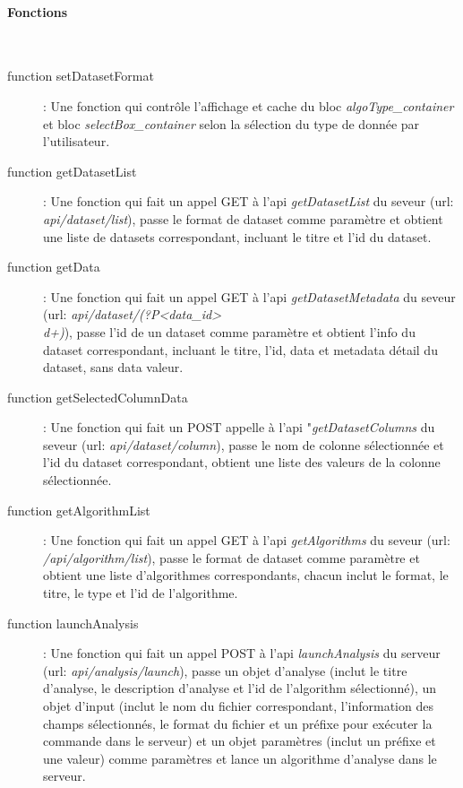 \documentclass[a4paper]{report}
\begin{document}
\paragraph{Fonctions}~\\
\begin{description}
	\item[function setDatasetFormat]: Une fonction qui contrôle l'affichage et cache du bloc \emph{algoType\_container} et bloc \emph{selectBox\_container} selon la sélection du type de donnée par l'utilisateur.
	
	\item[function getDatasetList]: Une fonction qui fait un appel GET à l'api \emph{getDatasetList} du seveur (url: \emph{api/dataset/list}), passe le format de dataset comme paramètre et obtient une liste de datasets correspondant, incluant le titre et l'id du dataset.
	
	\item[function getData]: Une fonction qui fait un appel GET à l'api \emph{getDatasetMetadata} du seveur (url: \emph{api/dataset/(?P<data\_id>\\d+)}), passe l'id de un dataset comme paramètre et obtient l'info du dataset correspondant, incluant le titre, l'id, data et metadata détail du dataset, sans data valeur.
	
	\item[function getSelectedColumnData]: Une fonction qui fait un POST appelle à l'api "\emph{getDatasetColumns} du seveur (url: \emph{api/dataset/column}), passe le nom de colonne sélectionnée et l'id du dataset correspondant, obtient une liste des valeurs de la colonne sélectionnée.
	
	\item[function getAlgorithmList]: Une fonction qui fait un appel GET à l'api \emph{getAlgorithms} du seveur (url: \emph{/api/algorithm/list}), passe le format de dataset comme paramètre et obtient une liste d'algorithmes correspondants, chacun inclut le format, le titre, le type et l'id de l'algorithme.
	
	\item[function launchAnalysis]: Une fonction qui fait un appel POST à l'api \emph{launchAnalysis} du serveur (url: \emph{api/analysis/launch}), passe un objet d'analyse (inclut le titre d'analyse, le description d'analyse et l'id de l'algorithm sélectionné), un objet d'input (inclut le nom du fichier correspondant, l'information des champs sélectionnés, le format du fichier et un préfixe pour exécuter la commande dans le serveur) et un objet paramètres (inclut un préfixe et une valeur) comme paramètres et lance un algorithme d'analyse dans le serveur.
	

\end{description}
\end{document}
